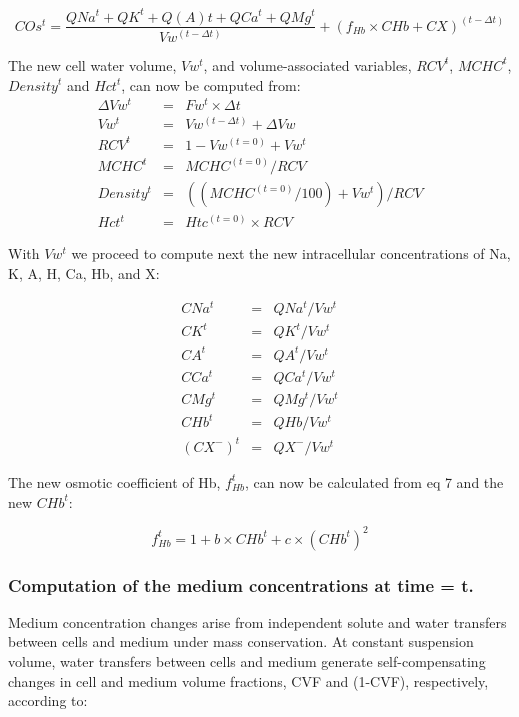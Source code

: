 \documentclass[a4paper]{article}
\newcommand{\cell}[1]{C#1}
\newcommand{\CNa}{\cell{Na}}
\newcommand{\CK}{\cell{K}}
\newcommand{\CA}{\cell{A}}
\newcommand{\CHb}{\cell{Hb}}
\newcommand{\CCa}{\cell{Ca}}
\newcommand{\CMg}{\cell{Mg}}
\newcommand{\CX}{\cell{X}}
\begin{document}
\begin{equation}
COs^t = \frac{QNa^t + QK^t + Q(A)t + QCa^t + QMg^t}{Vw^{(t-\Delta t)}}  + (f_{Hb}\times\CHb + \CX )^{(t-\Delta t)}
\end{equation}


\setcounter{equation}{0}
\renewcommand{\theequation}{23\alph{equation}}

The new cell water volume, $Vw^t$, and volume-associated variables, $RCV^t$, $MCHC^t$, $Density^t$ and $Hct^t$, can now be computed from: 
\begin{eqnarray}
\Delta Vw^t &=& Fw^t\times\Delta t \\
Vw^t &=& Vw^{(t-\Delta t)} + \Delta Vw \\
RCV^t &=& 1-Vw^{(t=0)} + Vw^t  \\
MCHC^t &=& MCHC^{(t=0)}/RCV  \\
Density^t &=& ((MCHC^{(t=0)}/100) + Vw^t)/RCV  \\
Hct^t &=& Htc^{(t=0)}\times RCV  
\end{eqnarray}

With $Vw^t$ we proceed to compute next the new intracellular concentrations of Na, K, A, H, Ca, Hb, and X:

\setcounter{equation}{0}
\renewcommand{\theequation}{24\alph{equation}}

\begin{eqnarray}
\CNa^t &=& QNa^t/Vw^t \\
\CK^t &=& QK^t/Vw^t \\
\CA^t &=& QA^t/Vw^t  \\
\CCa^t &=& QCa^t/Vw^t  \\
\CMg^t &=& QMg^t/Vw^t  \\
\CHb^t &=& QHb/Vw^t \\
(\CX^{-})^t &=& QX^{-} /Vw^t  
\end{eqnarray}

The new osmotic coefficient of Hb, $f_{Hb}^t$, can now be calculated from eq 7 and the new $\CHb^t$:

\setcounter{equation}{24}
\renewcommand{\theequation}{\arabic{equation}}

\begin{equation}
f_{Hb}^t = 1 + b\times\CHb^t + c\times (CHb^t)^2
\end{equation}

\subsubsection{Computation of the medium concentrations at time = t.}
Medium concentration changes arise from independent solute and water transfers between cells and medium under mass conservation.  At constant suspension volume, water transfers between cells and medium generate self-compensating changes in cell and medium volume fractions, CVF and (1-CVF), respectively, according to:
\end{document}
